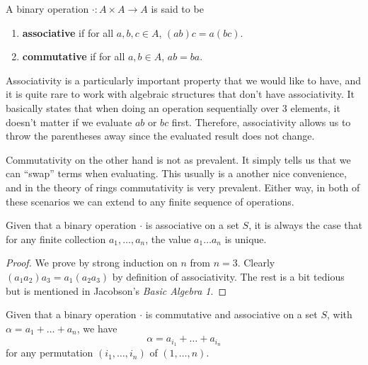 \begin{definition}
  A binary operation $\cdot : A \times A \to A$ is said to be 
  \begin{enumerate}
    \item \textbf{associative} if for all $a, b, c \in A$, $(ab)c = a(bc)$. 
    \item \textbf{commutative} if for all $a, b \in A$, $ab = ba$. 
  \end{enumerate}
\end{definition}

Associativity is a particularly important property that we would like to have, and it is quite rare to work with algebraic structures that don't have associativity. It basically states that when doing an operation sequentially over 3 elements, it doesn't matter if we evaluate $ab$ or $bc$ first. Therefore, associativity allows us to throw the parentheses away since the evaluated result does not change. 

Commutativity on the other hand is not as prevalent. It simply tells us that we can ``swap'' terms when evaluating. This usually is a another nice convenience, and in the theory of rings commutativity is very prevalent. Either way, in both of these scenarios we can extend to any finite sequence of operations.  

\begin{theorem}
  Given that a binary operation $\cdot$ is associative on a set $S$, it is always the case that for any finite collection $a_1, \ldots, a_n$, the value $a_1 \ldots a_n$ is unique. 
\end{theorem}
\begin{proof}
  We prove by strong induction on $n$ from $n = 3$. Clearly $(a_1 a_2) a_3 = a_1 (a_2 a_3)$ by definition of associativity. The rest is a bit tedious but is mentioned in Jacobson's \textit{Basic Algebra 1}. 
\end{proof}

\begin{theorem}
  Given that a binary operation $\cdot$ is commutative and associative on a set $S$, with $\alpha = a_1 + \ldots + a_n$, we have 
  \begin{equation}
    \alpha = a_{i_1} + \ldots + a_{i_n}
  \end{equation}
  for any permutation $(i_1, \ldots, i_n)$ of $(1, \ldots, n)$. 
\end{theorem}

